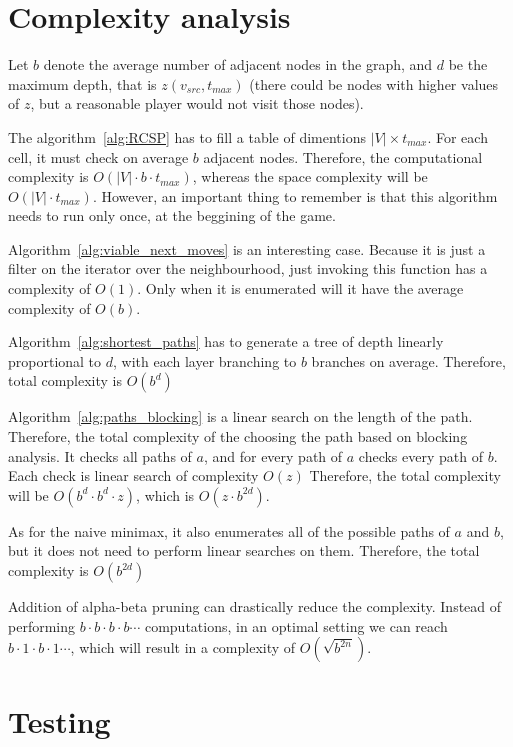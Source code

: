 \documentclass[12pt]{article}
\begin{document}
\clearpage
\section{Complexity analysis}

Let $b$ denote the average number of adjacent nodes in the graph,
and $d$ be the maximum depth, that is $z(v_{src},t_{max})$ (there could be nodes with higher values of $z$, but a reasonable player would not visit those nodes).

The algorithm~\ref*{alg:RCSP} has to fill a table of dimentions $|V| \times t_{max}$.
For each cell, it must check on average $b$ adjacent nodes.
Therefore, the computational complexity is $O(|V| \cdot b \cdot t_{max})$, whereas the space complexity will be $O(|V| \cdot t_{max})$.
However, an important thing to remember is that this algorithm needs to run only once, at the beggining of the game.

Algorithm~\ref{alg:viable_next_moves} is an interesting case.
Because it is just a filter on the iterator over the neighbourhood, just invoking this function has a complexity of $O(1)$.
Only when it is enumerated will it have the average complexity of $O(b)$.

Algorithm~\ref{alg:shortest_paths} has to generate a 
tree of depth linearly proportional to $d$, 
with each layer branching to $b$ branches on average.
Therefore, total complexity is $O(b^d)$

Algorithm~\ref{alg:paths_blocking} is a linear search on the length of the path.
Therefore, the total complexity of the choosing the path based on blocking analysis.
It checks all paths of $a$, and for every path of $a$ checks every path of $b$.
Each check is linear search of complexity $O(z)$
Therefore, the total complexity will be $O(b^d \cdot b^d \cdot z)$, which is $O(z \cdot b^{2d})$.

As for the naive minimax, it also enumerates all of the possible paths of $a$ and $b$,
but it does not need to perform linear searches on them.
Therefore, the total complexity is $O(b^{2d})$

Addition of alpha-beta pruning can drastically reduce the complexity.
Instead of performing $b \cdot b \cdot b \cdot b \cdots$ computations,
in an optimal setting we can reach $b \cdot 1 \cdot b \cdot 1 \cdots$, which will result in a complexity of $O(\sqrt{b^{2n}})$.

\clearpage
\section{Testing}
\end{document}
